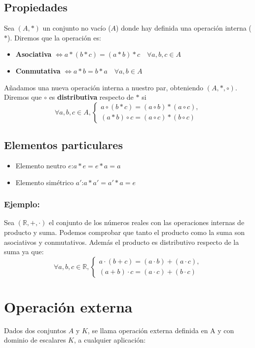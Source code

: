 \documentclass[0_algebra.tex]{subfiles}
\begin{document}
\subsection*{Propiedades}
Sea $(A,*)$ un conjunto no vacío ($A$) donde hay definida una operación interna ($*$). Diremos que la operación es:

\begin{itemize}
\item \textbf{Asociativa} $\Leftrightarrow a*(b*c)=(a*b)*c \quad \forall a,b,c \in A$
\item \textbf{Conmutativa} $\Leftrightarrow a*b=b*a \quad \forall a,b \in A$
\end{itemize}

Añadamos una nueva operación interna a nuestro par, obteniendo $(A,*,\circ)$. Diremos que $\circ$ es \textbf{distributiva} respecto de $*$ si
$$
\forall a,b,c \in A,
\begin{cases}
a\circ (b*c)=(a\circ b)*(a\circ c),\\
(a*b)\circ c= (a \circ c) * (b \circ c)
\end{cases}
$$

\subsection*{Elementos particulares}
\begin{itemize}
\item Elemento neutro $e$:\quad $a*e=e*a=a$
\item Elemento simétrico $a'$:\quad $a*a'=a'*a=e$
\end{itemize}

\subsubsection*{Ejemplo:}
Sea $(\mathbb{R},+,\cdot )$ el conjunto de los números reales con las operaciones internas de producto y suma. Podemos comprobar que tanto el producto como la suma son asociativos y conmutativos. Además el producto es distributivo respecto de la suma ya que:
$$
\forall a,b,c \in \mathbb{R},
\begin{cases}
a\cdot (b+c)=(a\cdot b)+(a \cdot c),\\
(a+b)\cdot c= (a \cdot c) + (b \cdot c)
\end{cases}
$$


\section{Operación externa}
Dados dos conjuntos $A$ y $K$, se llama operación externa definida en A y con dominio de escalares $K$, a cualquier aplicación:\\
\end{document}
